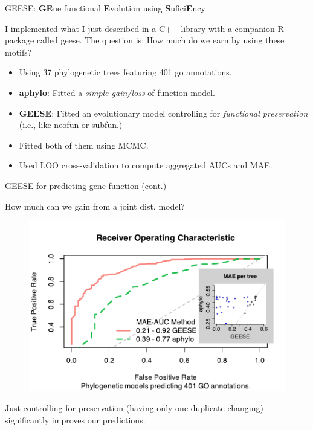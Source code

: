 \documentclass[10pt,aspectratio=169]{beamer}
\newcounter{frame}[frame]
\begin{document}
\begin{frame}{GEESE: \textbf{GE}ne functional \textbf{E}volution using \textbf{S}ufici\textbf{E}ncy}

I implemented what I just described in a C++ library with a companion R package called geese. The question is: How much do we earn by using these motifs?\\\bigskip
\pause
\begin{itemize}[<+->]
    \item Using 37 phylogenetic trees featuring 401 go annotations.
    \item \textbf{aphylo}: Fitted a \textit{simple gain/loss} of function model.
    \item \textbf{GEESE}: Fitted an evolutionary model controlling for \textit{functional preservation} (i.e., like neofun or subfun.)
    \item Fitted both of them using MCMC.
    \item Used LOO cross-validation to compute aggregated AUCs and MAE.
\end{itemize}
\end{frame}

\begin{frame}{GEESE for predicting gene function (cont.)}

How much can we gain from a joint dist. model?
    
\begin{figure}
\centering
    \includegraphics[width = .7\linewidth]{fig/mcmc-analysis-unif-prior-curated-auc-and-mae.pdf}
    \label{fig:auc-geese-vs-aphylo}
\end{figure}

Just controlling for preservation (having only one duplicate changing) significantly improves our predictions.
    
\end{frame}
\end{document}
